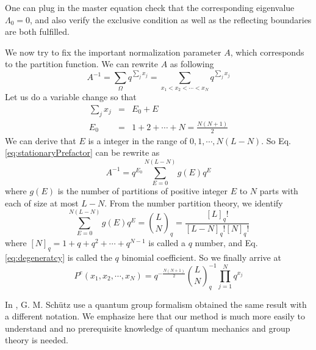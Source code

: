 \documentclass[aps,showpacs,twocolumn,floatfix,prx,superscriptaddress]{revtex4-1}
\begin{document}
One can plug in the master equation check that the corresponding eigenvalue $\Lambda_0= 0$, and also verify the exclusive condition as well as the reflecting boundaries are both fulfilled.

We now try to fix the important normalization parameter $A$, which corresponds to the partition function. We can rewrite $A$ as following
\begin{equation}
    \label{eq:stationaryPrefactor}
    A^{-1} = \sum_{\Omega} q^{\sum_j{x_j}} = 
    \sum_{x_1 < x_2 < \cdots < x_N} q^{\sum_j{x_j}}
\end{equation}
Let us do a variable change so that 
\begin{eqnarray*}
    \sum_j{x_j} &=& E_0 + E \\
    E_0 &=& 1 + 2 + \cdots + N = \frac{N(N+1)}{2}
\end{eqnarray*}
We can derive that $E$ is a integer in the range of $0, 1, \cdots, N(L-N)$. So
Eq. \eqref{eq:stationaryPrefactor} can be rewrite as 
\begin{equation}
    \label{eq:prefactorRewrite}
    A^{-1} = q^{E_0}\sum_{E=0}^{N(L-N)}g(E)q^E
\end{equation}
where $g(E)$ is the number of partitions of positive integer $E$ to $N$ parts with each of size at most $L-N$. From the number partition theory, we identify
\begin{equation}
    \label{eq:degeneratcy}
    \sum_{E=0}^{N(L-N)}g(E)q^E = \binom{L}{N}_q =
    \frac{[L]_q!}{[L-N]_q![N]_q!}
\end{equation}
where $[N]_q = 1 + q + q^2 + \cdots + q^{N-1}$ is called a $q$ number, and Eq. \eqref{eq:degeneratcy} is called the $q$ binomial coefficient\cite{}.  So we finally arrive at 
\begin{equation}
    \label{eq:stationarySolutionN}
    P^e(x_1, x_2, \cdots, x_N) = q^{-\frac{N(N+1)}{2}}
    \binom{L}{N}_q^{-1}\prod_{j=1}^N{q^{x_j}}
\end{equation}

In \cite{}, G. M. Sch\"{u}tz use a quantum group formalism obtained the same result with a different notation. We emphasize here that our method is much more easily to understand and no prerequisite knowledge of quantum mechanics and group theory is needed.
\end{document}
